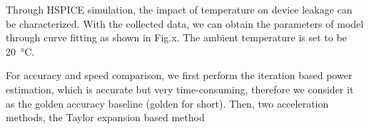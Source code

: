 Through HSPICE simulation, the impact of temperature on device leakage can be characterized. With the collected data, we can obtain the parameters of model through curve fitting as shown in Fig.x. The ambient temperature is set to be \SI{20}{\degreeCelsius}.

For accuracy and speed comparison, we first perform the iteration based power estimation, which is accurate but very time-consuming, therefore we consider it as the golden accuracy baseline (golden for short). Then, two acceleration methods, the Taylor expansion based method 